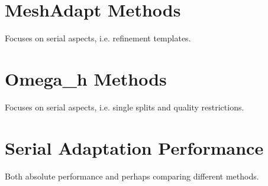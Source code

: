 \section{MeshAdapt Methods}

Focuses on serial aspects, i.e. refinement templates.

\section{Omega\_h Methods}

Focuses on serial aspects, i.e. single splits and
quality restrictions.

\section{Serial Adaptation Performance}

Both absolute performance and perhaps comparing
different methods.



